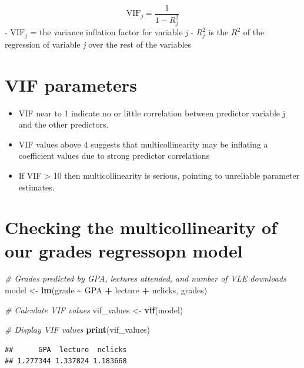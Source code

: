 \documentclass[
]{article}
\newenvironment{Shaded}{\begin{snugshade}}{\end{snugshade}}
\newcommand{\CommentTok}[1]{\textcolor[rgb]{0.56,0.35,0.01}{\textit{#1}}}
\newcommand{\FunctionTok}[1]{\textcolor[rgb]{0.13,0.29,0.53}{\textbf{#1}}}
\newcommand{\NormalTok}[1]{#1}
\newcommand{\OtherTok}[1]{\textcolor[rgb]{0.56,0.35,0.01}{#1}}
\newcommand{\SpecialCharTok}[1]{\textcolor[rgb]{0.81,0.36,0.00}{\textbf{#1}}}
\providecommand{\tightlist}{%
  \setlength{\itemsep}{0pt}\setlength{\parskip}{0pt}}
\begin{document}
\[\text{VIF}_{j} = \frac{1}{1 - R_{j}^2}\] - \(\text{VIF}_{j}\) = the
variance inflation factor for variable \emph{j} - \(R_{j}^2\) is the
\(R^2\) of the regression of variable \emph{j} over the rest of the
variables

\hypertarget{vif-parameters}{%
\section{VIF parameters}\label{vif-parameters}}

\begin{itemize}
\tightlist
\item
  VIF near to 1 indicate no or little correlation between predictor
  variable j and the other predictors.
\item
  VIF values above 4 suggests that multicollinearity may be inflating a
  coefficient values due to strong predictor correlations
\item
  If VIF \textgreater{} 10 then multicollinearity is serious, pointing
  to unreliable parameter estimates.
\end{itemize}

\hypertarget{checking-the-multicollinearity-of-our-grades-regressopn-model}{%
\section{Checking the multicollinearity of our grades regressopn
model}\label{checking-the-multicollinearity-of-our-grades-regressopn-model}}

\begin{Shaded}
\begin{Highlighting}[]
\CommentTok{\# Grades predicted by GPA, lectures attended, and number of VLE downloads }
\NormalTok{model }\OtherTok{\textless{}{-}} 
  \FunctionTok{lm}\NormalTok{(grade }\SpecialCharTok{\textasciitilde{}}\NormalTok{ GPA }\SpecialCharTok{+}\NormalTok{ lecture }\SpecialCharTok{+}\NormalTok{ nclicks, grades) }

\CommentTok{\# Calculate VIF values}
\NormalTok{vif\_values }\OtherTok{\textless{}{-}} 
  \FunctionTok{vif}\NormalTok{(model)}

\CommentTok{\# Display VIF values}
\FunctionTok{print}\NormalTok{(vif\_values)}
\end{Highlighting}
\end{Shaded}

\begin{verbatim}
##      GPA  lecture  nclicks 
## 1.277344 1.337824 1.183668
\end{verbatim}
\end{document}
